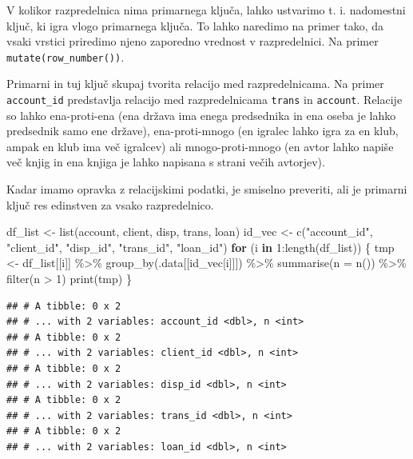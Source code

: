 \documentclass[
]{book}
\newenvironment{Shaded}{\begin{snugshade}}{\end{snugshade}}
\newcommand{\AttributeTok}[1]{\textcolor[rgb]{0.77,0.63,0.00}{#1}}
\newcommand{\ControlFlowTok}[1]{\textcolor[rgb]{0.13,0.29,0.53}{\textbf{#1}}}
\newcommand{\DecValTok}[1]{\textcolor[rgb]{0.00,0.00,0.81}{#1}}
\newcommand{\FunctionTok}[1]{\textcolor[rgb]{0.00,0.00,0.00}{#1}}
\newcommand{\NormalTok}[1]{#1}
\newcommand{\OtherTok}[1]{\textcolor[rgb]{0.56,0.35,0.01}{#1}}
\newcommand{\SpecialCharTok}[1]{\textcolor[rgb]{0.00,0.00,0.00}{#1}}
\newcommand{\StringTok}[1]{\textcolor[rgb]{0.31,0.60,0.02}{#1}}
\begin{document}
V kolikor razpredelnica nima primarnega ključa, lahko ustvarimo t. i. nadomestni ključ, ki igra vlogo primarnega ključa. To lahko naredimo na primer tako, da vsaki vrstici priredimo njeno zaporedno vrednost v razpredelnici. Na primer \texttt{mutate(row\_number())}.

Primarni in tuj ključ skupaj tvorita relacijo med razpredelnicama. Na primer \texttt{account\_id} predstavlja relacijo med razpredelnicama \texttt{trans} in \texttt{account}. Relacije so lahko ena-proti-ena (ena država ima enega predsednika in ena oseba je lahko predsednik samo ene države), ena-proti-mnogo (en igralec lahko igra za en klub, ampak en klub ima več igralcev) ali mnogo-proti-mnogo (en avtor lahko napiše več knjig in ena knjiga je lahko napisana s strani večih avtorjev).

Kadar imamo opravka z relacijskimi podatki, je smiselno preveriti, ali je primarni ključ res edinstven za vsako razpredelnico.

\begin{Shaded}
\begin{Highlighting}[]
\NormalTok{df\_list }\OtherTok{\textless{}{-}} \FunctionTok{list}\NormalTok{(account, client, disp, trans, loan)}
\NormalTok{id\_vec  }\OtherTok{\textless{}{-}} \FunctionTok{c}\NormalTok{(}\StringTok{"account\_id"}\NormalTok{, }\StringTok{"client\_id"}\NormalTok{, }\StringTok{"disp\_id"}\NormalTok{, }\StringTok{"trans\_id"}\NormalTok{, }\StringTok{"loan\_id"}\NormalTok{)}
\ControlFlowTok{for}\NormalTok{ (i }\ControlFlowTok{in} \DecValTok{1}\SpecialCharTok{:}\FunctionTok{length}\NormalTok{(df\_list)) \{}
\NormalTok{  tmp }\OtherTok{\textless{}{-}}\NormalTok{ df\_list[[i]] }\SpecialCharTok{\%\textgreater{}\%}
    \FunctionTok{group\_by}\NormalTok{(.data[[id\_vec[i]]]) }\SpecialCharTok{\%\textgreater{}\%}
    \FunctionTok{summarise}\NormalTok{(}\AttributeTok{n =} \FunctionTok{n}\NormalTok{()) }\SpecialCharTok{\%\textgreater{}\%}
    \FunctionTok{filter}\NormalTok{(n }\SpecialCharTok{\textgreater{}} \DecValTok{1}\NormalTok{)}
  \FunctionTok{print}\NormalTok{(tmp)}
\NormalTok{\}}
\end{Highlighting}
\end{Shaded}

\begin{verbatim}
## # A tibble: 0 x 2
## # ... with 2 variables: account_id <dbl>, n <int>
## # A tibble: 0 x 2
## # ... with 2 variables: client_id <dbl>, n <int>
## # A tibble: 0 x 2
## # ... with 2 variables: disp_id <dbl>, n <int>
## # A tibble: 0 x 2
## # ... with 2 variables: trans_id <dbl>, n <int>
## # A tibble: 0 x 2
## # ... with 2 variables: loan_id <dbl>, n <int>
\end{verbatim}
\end{document}
